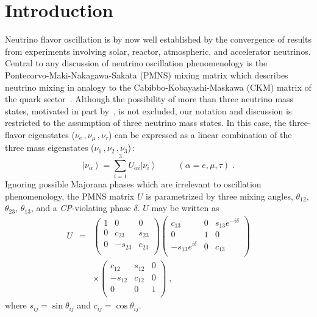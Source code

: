 \documentclass[aps,prc,twocolumn,groupedaddress,showpacs,amsmath,amssymb,floatfix,superscriptaddress]{revtex4}
\begin{document}
\section{Introduction}
\label{section:Introduction}
Neutrino flavor oscillation is by now well established by the convergence of results from experiments involving solar, reactor, atmospheric, and accelerator neutrinos. Central to any discussion of neutrino oscillation phenomenology is the Pontecorvo-Maki-Nakagawa-Sakata (PMNS) mixing matrix which describes neutrino mixing in analogy to the Cabibbo-Kobayashi-Maskawa (CKM) matrix of the quark sector~\cite{Nakamura2010}. Although the possibility of more than three neutrino mass states, motivated in part by~\cite{Aguilar2001}, is not excluded, our notation and discussion is restricted to the assumption of three neutrino mass states. In this case, the three-flavor eigenstates ($\nu_{e}\,,\nu_{\mu}\,,\nu_{\tau}$) can be expressed as a linear combination of the three mass eigenstates ($\nu_{1}\,,\nu_{2}\,,\nu_{3}$)\,:
\vspace{-0.47cm}
 \[
\left| \nu_{\alpha}\right\rangle = \sum_{i=1}^{3} U_{\alpha i} \left| \nu_{i}\right\rangle \hspace{1cm} (\alpha = e, \mu, \tau)\;. \label{Eq-FlavorMass}
\]
Ignoring possible Majorana phases which are irrelevant to oscillation phenomenology, the PMNS matrix $U$ is parametrized by three mixing angles, $\theta_{12}$, $\theta_{23}$, $\theta_{13}$, and a {\it CP}-violating phase $\delta$. $U$ may be written as 
\begin{eqnarray}
\label{eqn:MSNPMatrix}
U & = & 
\left(
\begin{array}{ccc}
1 & 0 & 0\\
0 & c_{23} & s_{23}\\
0 & -s_{23} & c_{23}\\
\end{array}
\right)
\left(
\begin{array}{ccc}
c_{13} & 0 & s_{13}e^{-i\delta}\\
0 & 1 & 0\\
-s_{13}e^{i\delta} & 0 & c_{13}\\
\end{array}
\right) \nonumber \\
 & & 
\times
\left(
\begin{array}{ccc}
c_{12} & s_{12} & 0\\
-s_{12} & c_{12} & 0\\
0 & 0 & 1\\
\end{array}
\right)\;,
\end{eqnarray}
where $s_{ij} = \sin \theta_{ij}$ and $c_{ij} = \cos \theta_{ij}$.
\end{document}
